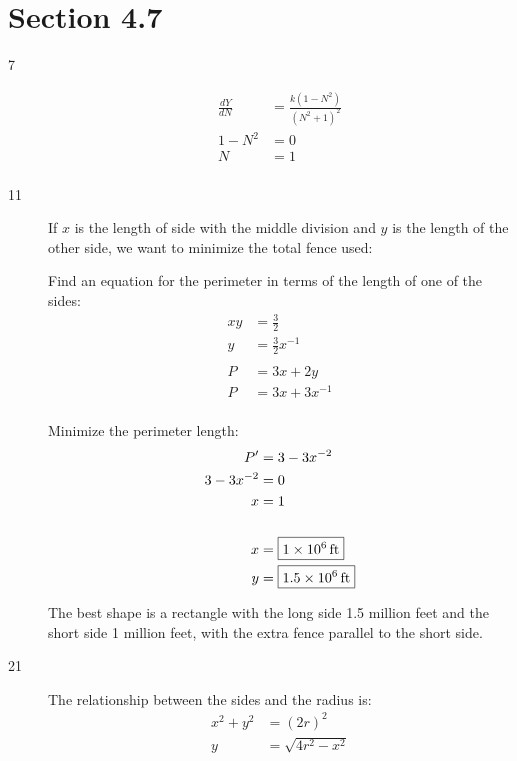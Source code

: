 \documentclass[letterpaper, landscape]{exam}
\begin{document}
  \newpage

  \section{Section 4.7} %

  \begin{description}
    \item[7]
      \begin{align*}
        \frac{dY}{dN} &= \frac{ k \left( 1 - N^2 \right) }{ \left( N^2 + 1\right )^2 }
        \\
        1 - N^2 & = 0 \\
        N       & = \boxed{ 1 } \\
      \end{align*}

    \item[11]
      If $x$ is the length of side with the middle division and $y$ is the length of the other side,
      we want to minimize the total fence used:

      Find an equation for the perimeter in terms of the length of one of the sides:
      \begin{align*}
        xy & = \frac{3}{2} \\
        y  & = \frac{3}{2} x^{-1} \\
        \\
        P & = 3x + 2y \\
        P & = 3x + 3x^{-1} \\
      \end{align*}

      Minimize the perimeter length:
      \begin{align*}
        P'          & = 3 - 3x^{-2} \\
        3 - 3x^{-2} & = 0 \\
        x           & = 1 \\
        \\
        x  & = \boxed{ \unit[1 \times 10^6]{ft} } \\
        y  & = \boxed{ \unit[1.5 \times 10^6]{ft} } \\
      \end{align*}

      The best shape is a rectangle with the long side 1.5 million feet and the short side 1 million
      feet, with the extra fence parallel to the short side.

    \item[21]
      The relationship between the sides and the radius is:
      \begin{align*}
        x^2 + y^2 & = (2r)^2 \\
        y         & = \sqrt{4r^2 - x^2} \\
      \end{align*}


\end{description}
\end{document}
